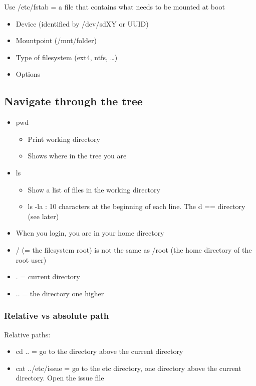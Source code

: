 \documentclass{article}
\begin{document}
Use /etc/fstab = a file that contains what needs to be mounted at boot

\begin{itemize}
    \item Device (identified by /dev/sdXY or UUID) 
    \item Mountpoint (/mnt/folder)
    \item Type of filesystem (ext4, ntfs, \dots)
    \item Options
\end{itemize}


\subsection{Navigate through the tree}

\begin{itemize}
    \item pwd
    \begin{itemize}
        \item Print working directory
        \item Shows where in the tree you are
    \end{itemize}
    \item ls
    \begin{itemize}
        \item Show a list of files in the working directory
        \item ls -la : 10 characters at the beginning of each line. The d == directory (see later)
    \end{itemize}
    \item When you login, you are in your home directory
    \item / (= the filesystem root) is not the same as /root (the home directory of the root user)
    \item . = current directory
    \item .. = the directory one higher
\end{itemize}

\subsubsection{Relative vs absolute path}

Relative paths:

\begin{itemize}
    \item cd .. = go to the directory above the current directory
    \item cat ../etc/issue = go to the etc directory, one directory above the current directory. Open the issue file
\end{itemize}
\end{document}
